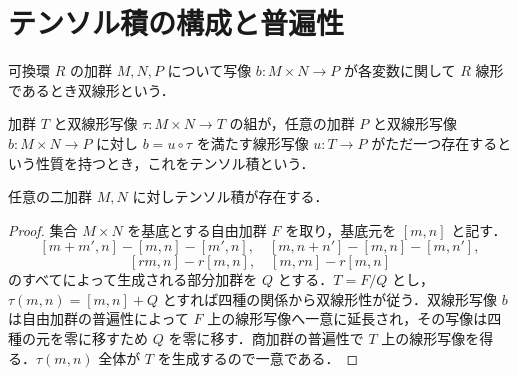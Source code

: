 \section{テンソル積の構成と普遍性}
\begin{defn}[加群の双線形写像]
可換環 $R$ の加群 $M,N,P$ について写像 $b:M\times N\to P$ が各変数に関して $R$ 線形であるとき双線形という．
\end{defn}
\begin{defn}[テンソル積の普遍性]
加群 $T$ と双線形写像 $\tau:M\times N\to T$ の組が，任意の加群 $P$ と双線形写像 $b:M\times N\to P$ に対し $b=u\circ\tau$ を満たす線形写像 $u:T\to P$ がただ一つ存在するという性質を持つとき，これをテンソル積という．
\end{defn}
\begin{prop}[テンソル積の存在]
任意の二加群 $M,N$ に対しテンソル積が存在する．
\end{prop}
\begin{proof}
集合 $M\times N$ を基底とする自由加群 $F$ を取り，基底元を $[m,n]$ と記す．
\[
[m+m',n]-[m,n]-[m',n],\quad [m,n+n']-[m,n]-[m,n'],
\]
\[
[rm,n]-r[m,n],\quad [m,rn]-r[m,n]
\]
のすべてによって生成される部分加群を $Q$ とする．$T=F/Q$ とし，$\tau(m,n)=[m,n]+Q$ とすれば四種の関係から双線形性が従う．双線形写像 $b$ は自由加群の普遍性によって $F$ 上の線形写像へ一意に延長され，その写像は四種の元を零に移すため $Q$ を零に移す．商加群の普遍性で $T$ 上の線形写像を得る．$\tau(m,n)$ 全体が $T$ を生成するので一意である．
\end{proof}
